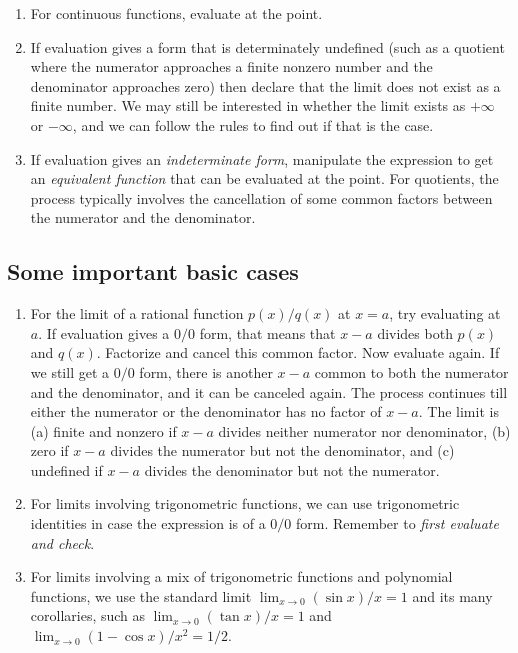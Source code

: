 \documentclass{amsart}
\begin{document}
\begin{enumerate}
\item For continuous functions, evaluate at the point.
\item If evaluation gives a form that is determinately undefined (such
  as a quotient where the numerator approaches a finite nonzero number
  and the denominator approaches zero) then declare that the limit
  does not exist as a finite number. We may still be interested in
  whether the limit exists as $+\infty$ or $-\infty$, and we can
  follow the rules to find out if that is the case.
\item If evaluation gives an {\em indeterminate form}, manipulate the
  expression to get an {\em equivalent function} that can be evaluated
  at the point. For quotients, the process typically involves the
  cancellation of some common factors between the numerator and the
  denominator.
\end{enumerate}

\subsection{Some important basic cases}

\begin{enumerate}
\item For the limit of a rational function $p(x)/q(x)$ at $x = a$, try
  evaluating at $a$. If evaluation gives a $0/0$ form, that means that
  $x - a$ divides both $p(x)$ and $q(x)$. Factorize and cancel this
  common factor. Now evaluate again. If we still get a $0/0$ form,
  there is another $x -a$ common to both the numerator and the
  denominator, and it can be canceled again. The process continues
  till either the numerator or the denominator has no factor of $x -
  a$. The limit is (a) finite and nonzero if $x - a$ divides neither
  numerator nor denominator, (b) zero if $x - a$ divides the numerator
  but not the denominator, and (c) undefined if $x - a$ divides the
  denominator but not the numerator.
\item For limits involving trigonometric functions, we can use
  trigonometric identities in case the expression is of a $0/0$
  form. Remember to {\em first evaluate and check}.
\item For limits involving a mix of trigonometric functions and
  polynomial functions, we use the standard limit $\lim_{x \to 0}
  (\sin x)/x = 1$ and its many corollaries, such as $\lim_{x \to
  0} (\tan x)/x = 1$ and $\lim_{x \to 0} (1 - \cos x)/x^2 = 1/2$.
\end{enumerate}
\end{document}
